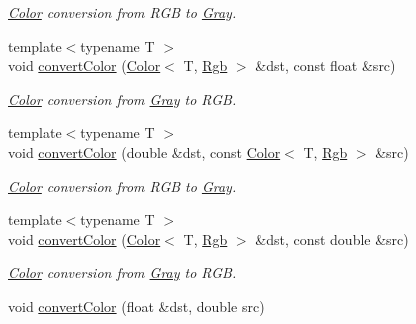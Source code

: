\begin{DoxyCompactItemize}
\begin{DoxyCompactList}\small\item\em \hyperlink{class_d_o_1_1_color}{Color} conversion from R\-G\-B to \hyperlink{struct_d_o_1_1_gray}{Gray}. \end{DoxyCompactList}\item 
\hypertarget{group___color_conversion_ga9e8d2d7254720f233eed734913c752e0}{{\footnotesize template$<$typename T $>$ }\\void \hyperlink{group___color_conversion_ga9e8d2d7254720f233eed734913c752e0}{convert\-Color} (\hyperlink{class_d_o_1_1_color}{Color}$<$ T, \hyperlink{group___color_space_gaad92fea51e98e11252ac86f2c8665d13}{Rgb} $>$ \&dst, const float \&src)}\label{group___color_conversion_ga9e8d2d7254720f233eed734913c752e0}

\begin{DoxyCompactList}\small\item\em \hyperlink{class_d_o_1_1_color}{Color} conversion from \hyperlink{struct_d_o_1_1_gray}{Gray} to R\-G\-B. \end{DoxyCompactList}\item 
\hypertarget{group___color_conversion_gae34a9bddf5dfcceeacb4e19819b7832e}{{\footnotesize template$<$typename T $>$ }\\void \hyperlink{group___color_conversion_gae34a9bddf5dfcceeacb4e19819b7832e}{convert\-Color} (double \&dst, const \hyperlink{class_d_o_1_1_color}{Color}$<$ T, \hyperlink{group___color_space_gaad92fea51e98e11252ac86f2c8665d13}{Rgb} $>$ \&src)}\label{group___color_conversion_gae34a9bddf5dfcceeacb4e19819b7832e}

\begin{DoxyCompactList}\small\item\em \hyperlink{class_d_o_1_1_color}{Color} conversion from R\-G\-B to \hyperlink{struct_d_o_1_1_gray}{Gray}. \end{DoxyCompactList}\item 
\hypertarget{group___color_conversion_gaf00036ce1c3287aa68280ca2e865ef14}{{\footnotesize template$<$typename T $>$ }\\void \hyperlink{group___color_conversion_gaf00036ce1c3287aa68280ca2e865ef14}{convert\-Color} (\hyperlink{class_d_o_1_1_color}{Color}$<$ T, \hyperlink{group___color_space_gaad92fea51e98e11252ac86f2c8665d13}{Rgb} $>$ \&dst, const double \&src)}\label{group___color_conversion_gaf00036ce1c3287aa68280ca2e865ef14}

\begin{DoxyCompactList}\small\item\em \hyperlink{class_d_o_1_1_color}{Color} conversion from \hyperlink{struct_d_o_1_1_gray}{Gray} to R\-G\-B. \end{DoxyCompactList}\item 
\hypertarget{group___color_conversion_ga8aa17d730c8424cb2b906ecd2c88c024}{void \hyperlink{group___color_conversion_ga8aa17d730c8424cb2b906ecd2c88c024}{convert\-Color} (float \&dst, double src)}\label{group___color_conversion_ga8aa17d730c8424cb2b906ecd2c88c024}


\end{DoxyCompactItemize}

